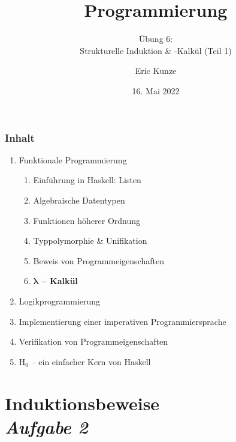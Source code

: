 \documentclass{beamer}
\begin{document}
	
	\title{Programmierung}
	\subtitle{Übung 6: \\ Strukturelle Induktion \& \textlambda-Kalkül (Teil 1)}
	\author{Eric Kunze}
	\date{16. Mai 2022}
	
	\maketitle
	


\begin{frame}[fragile] \frametitle{Inhalt}
	\begin{enumerate}
		\item Funktionale Programmierung
		\begin{enumerate}
			\item Einführung in Haskell: Listen
			\item Algebraische Datentypen
			\item Funktionen höherer Ordnung
			\item Typpolymorphie \& Unifikation
			\item Beweis von Programmeigenschaften
			\item \textbf{$\bm\lambda$ -- Kalkül}
		\end{enumerate}
		\item Logikprogrammierung
		\item Implementierung einer imperativen Programmiersprache
		\item Verifikation von Programmeigenschaften
		\item H${}_\text{0}$ -- ein einfacher Kern von Haskell
	\end{enumerate}
\end{frame}



\section{Induktionsbeweise \\ \textit{\normalsize Aufgabe 2}}
\end{document}
